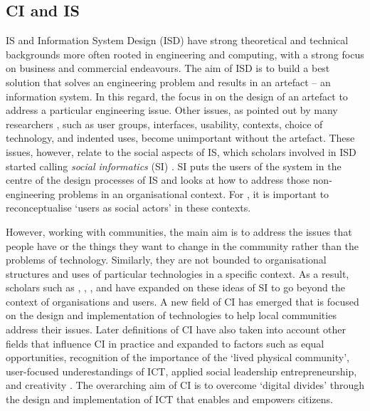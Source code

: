 \subsection{CI and IS}
\label{sub:ci_is}
IS and Information System Design (ISD) have strong theoretical and technical backgrounds more often rooted in engineering and computing, with a strong focus on business and commercial endeavours. The aim of ISD is to build a best solution that solves an engineering problem and results in an artefact -- an information system. In this regard, the focus in on the design of an artefact to address a particular engineering issue. Other issues, as pointed out by many researchers \citep{hirschheim_exploring_1996,hakken_social_2003,carroll_participatory_2007,leonardi_materiality_2008,stillman_community_2009}, such as user groups, interfaces, usability, contexts, choice of technology, and indented uses, become unimportant without the artefact. These issues, however, relate to the social aspects of IS, which scholars involved in ISD started calling \textit{social informatics} (SI) \citep{bowker_social_1997,kling_learning_2000}. SI puts the users of the system in the centre of the design processes of IS and looks at how to address those non-engineering problems in an organisational context. For \citet{lamb_reconceptualizing_2003}, it is important to reconceptualise `users as social actors' in these contexts.

However, working with communities, the main aim is to address the issues that people have or the things they want to change in the community rather than the problems of technology. Similarly, they are not bounded to organisational structures and uses of particular technologies in a specific context. As a result, scholars such as \citet{gurstein_introduction_2000}, \citet{hakken_social_2003}, \citet{bradley_social_2006}, and \citet{carroll_participatory_2007} have expanded on these ideas of SI to go beyond the context of organisations and users. A new field of CI \citet{gurstein_introduction_2000} has emerged that is focused on the design and implementation of technologies to help local communities address their issues. Later definitions of CI have also taken into account other fields that influence CI in practice and expanded to factors such as equal opportunities, recognition of the importance of the `lived physical community', user-focused underestandings of ICT, applied social leadership entrepreneurship, and creativity \citep[p. 12]{gurstein_what_2007}. The overarching aim of CI is to overcome `digital divides' through the design and implementation of ICT that enables and empowers citizens.


